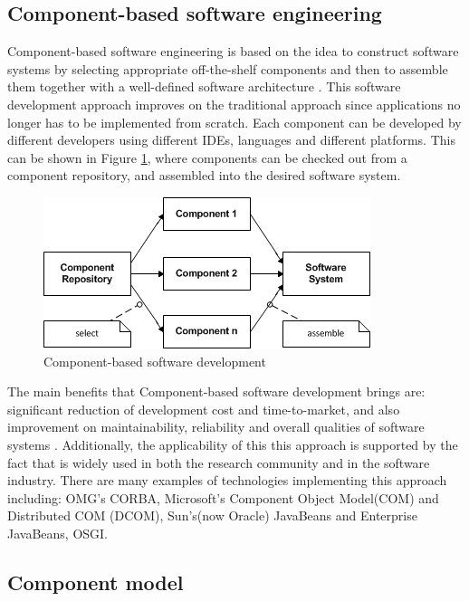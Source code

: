 \subsection{Component-based software engineering}

Component-based software engineering is based on the idea to construct software systems by selecting appropriate off-the-shelf components and then to assemble them together with a well-defined software architecture \cite{Pour}. This software development approach improves on the traditional approach since applications no longer has to be implemented from scratch. Each component can be developed by different developers using different IDEs, languages and different platforms. This can be shown in Figure \ref{fig_cbsd}, where components can be checked out from a component repository, and assembled into the desired software system.

\begin{figure}[h!]
  \centering
  	\includegraphics[scale=0.75]{plug-in/component-based.png}
  \caption{Component-based software development \cite{Pour} }
  \label{fig_cbsd}
\end{figure}

The main benefits that Component-based software development brings are: significant reduction of development cost and time-to-market, and also improvement on maintainability, reliability and overall qualities of software systems \cite{Pour1} \cite{Pour2}. Additionally, the applicability of this this approach is supported by the fact that is widely used in both the research community and in the software industry. There are many examples of technologies implementing this approach including: OMG's CORBA,  Microsoft's Component Object Model(COM) and Distributed COM (DCOM), Sun's(now Oracle) JavaBeans and Enterprise JavaBeans, OSGI.

\subsection{Component model}

